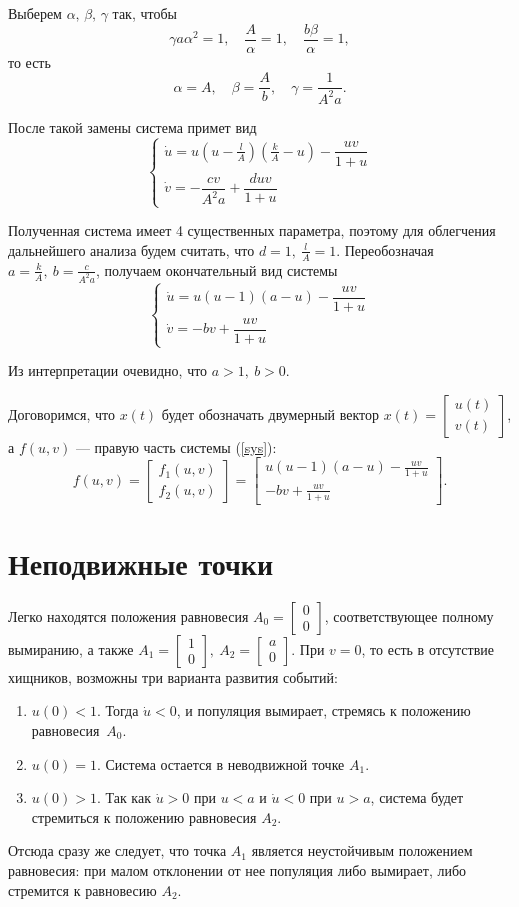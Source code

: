 \documentclass[16pt]{article}
\newcommand\Col[2]{\begin{bmatrix}
#1 \\ #2
\end{bmatrix}}
\begin{document}
Выберем $\alpha,\, \beta,\, \gamma$ так, чтобы
$$\gamma a \alpha^2 = 1, \quad \dfrac{A}{\alpha} = 1, \quad \dfrac{b\beta}{\alpha} = 1,$$
то есть
$$\alpha = A,\quad \beta = \dfrac{A}{b}, \quad \gamma = \dfrac{1}{A^2a}.$$

После такой замены система примет вид
$$
\begin{cases}
\dot u = u(u - \frac{l}{A})(\frac{k}{A} - u) - \dfrac{uv}{1 + u}\\
\dot v = -\dfrac{cv}{A^2a} + \dfrac{duv}{1 + u}
\end{cases}
$$

Полученная система имеет 4 существенных параметра, поэтому для облегчения дальнейшего анализа будем считать, что
$d = 1, \ \frac{l}{A} = 1$. Переобозначая $a = \frac{k}{A}, \ b = \frac{c}{A^2a}$, получаем окончательный вид системы
\begin{equation}\label{sys}
\begin{cases}
\dot u = u(u - 1)(a - u) - \dfrac{uv}{1 + u}\\
\dot v = -bv + \dfrac{uv}{1 + u}
\end{cases}
\end{equation}

Из интерпретации очевидно, что $a > 1,\ b > 0$.

Договоримся, что $x(t)$ будет обозначать двумерный вектор $x(t) = \Col{u(t)}{v(t)}$, а $f(u, v)$ --- правую
часть системы (\ref{sys}):
$$f(u, v) = \Col{f_1(u, v)}{f_2(u, v)} = \Col{u(u - 1)(a - u) - \frac{uv}{1 + u}}{-bv + \frac{uv}{1 + u}}.$$

\section{Неподвижные точки}
Легко находятся положения равновесия $A_0 = \Col00$, соответствующее полному вымиранию, а также
$A_1 = \Col10, \ A_2 = \Col{a}0$. При $v = 0$, то есть в отсутствие хищников, возможны три варианта развития
событий:
\begin{enumerate}
\item $u(0) < 1$. Тогда $\dot u < 0$, и популяция вымирает, стремясь к положению равновесия~$A_0$.
\item $u(0) = 1$. Система остается в неводвижной точке $A_1$.
\item $u(0) > 1$. Так как $\dot u > 0$ при $u < a$ и $\dot u < 0$ при $u > a$, система будет стремиться к положению
равновесия $A_2.$
\end{enumerate}

Отсюда сразу же следует, что точка $A_1$ является неустойчивым положением равновесия: при малом отклонении от нее
популяция либо вымирает, либо стремится к равновесию $A_2$.
\end{document}
